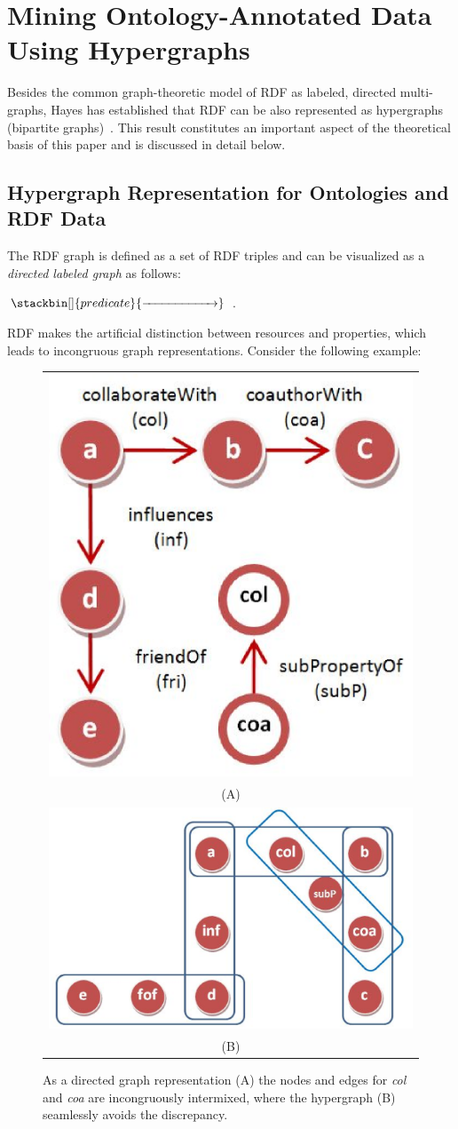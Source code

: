 \section{Mining Ontology-Annotated Data Using Hypergraphs}
\label{sec:method}
Besides the common graph-theoretic model of RDF as labeled, directed multi-graphs, Hayes has established that RDF can be also represented as hypergraphs (bipartite graphs)~\cite{GraphModelRDF}. This result constitutes an important aspect of the theoretical basis of this paper and is discussed in detail below.

\subsection{Hypergraph Representation for Ontologies and RDF Data}
The RDF graph is defined as a set of RDF triples and can be visualized as a \emph{directed labeled graph} as follows:
\begin{center} $\stackbin[]{predicate}{\xrightarrow{\hspace*{2cm}}}$ \;.\end{center}

RDF makes the artificial distinction between resources and properties, which leads to incongruous graph representations. Consider the following example:

\begin{figure}[tbh]
\begin{center}
\begin{tabular}{c}
\includegraphics[width=.22\textwidth]{fig/reg_graph.eps}\\
(A)\\
\includegraphics[width=.35\textwidth]{fig/hypergraph.eps}\\
(B)\\
\end{tabular}
\end{center}
\caption{\label{fig:graphcomp} As a directed graph representation (A) the nodes and edges for \emph{col} and \emph{coa} are incongruously intermixed, where the hypergraph (B) seamlessly avoids the discrepancy.}
\end{figure}

